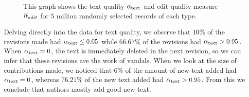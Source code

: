 \begin{figure}[t]
    \begin{center}
    \end{center}
    \caption[Measuring edit and text quality over revisions]{
    	This graph shows the text quality $\alpha_\text{text}$
        and edit quality measure ${\overline{\alpha}}_{edit}$
	for 5 million randomly selected records of each type.
    }
    \label{fig-revs-quality}
\end{figure}

Delving directly into the data for text quality, we observe
that $10\%$ of the revisions made had 
$\alpha_\text{text} \le 0.05$ while $66.67\%$ of the revisions had
$\alpha_\text{text} > 0.95$.
When $\alpha_\text{text} = 0$, the text is immediately deleted
in the next revision, so we can infer that these revisions
are the work of vandals.
When we look at the size of contributions made, we noticed that
$6\%$ of the amount of new text added had $\alpha_\text{text} = 0$,
whereas $76.21\%$ of the new text added had $\alpha_\text{text} > 0.95$.
From this we conclude that authors mostly add good new text.

